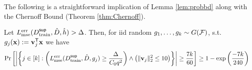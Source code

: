 The following is a straightforward implication of Lemma \ref{lem:probbd} along with the Chernoff Bound (Theorem \ref{thm:Chernoff}). 
\begin{lemma} \label{lem:ampprbbd}
    Let $L^{\textnormal{err}}_{\textnormal{mse}}(D^{\sf sup}_{\textnormal{train}}, \hat{D}, \hat{h})  > \Delta$. Then, for iid random $g_1, \dots, g_k \sim G(\mathcal{F})$, s.t. $g_j({\mathbf{x}}) := {\mathbf{v}}_j^{\sf T}{\mathbf{x}}$ we have
\begin{equation*}
        \displaystyle \Pr\left[\left|\left\{j \in [k] : \left(L^{\textnormal{err}}_{\textnormal{mse}}(D^{\sf sup}_{\textnormal{train}}, \hat{D}, g_j) \geq \frac{\Delta}{C_0q^2}\right)\wedge \left(\|{\mathbf{v}}_j\|_2^2 \leq 10\right)\right\}\right| \geq \frac{7k}{60}\right] \geq 1 - \textnormal{exp}\left(\frac{-7k}{240}\right)
        \end{equation*}
\end{lemma}

